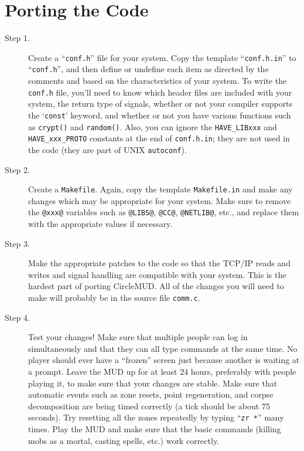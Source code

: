 \documentclass[11pt]{article}
\begin{document}
\section{Porting the Code}
\begin{description}
\item[Step 1.] Create a ``\texttt{conf.h}'' file for your system.\newline
Copy the template ``\texttt{conf.h.in}'' to ``\texttt{conf.h}'', and then define or undefine each item as directed by the comments and based on the characteristics of your system.  To write the \texttt{conf.h} file, you'll need to know which header files are included with your system, the return type of signals, whether or not your compiler supports the `\texttt{const}' keyword, and whether or not you have various functions such as \texttt{crypt()} and \texttt{random()}.\newline
Also, you can ignore the \texttt{HAVE\_LIBxxx} and \texttt{HAVE\_xxx\_PROTO} constants at the end of \texttt{conf.h.in}; they are not used in the code (they are part of UNIX \texttt{autoconf}).

\item[Step 2.] Create a \texttt{Makefile}.\newline
Again, copy the template \texttt{Makefile.in} and make any changes which may be appropriate for your system.  Make sure to remove the \texttt{@xxx@} variables such as \texttt{@LIBS@}, \texttt{@CC@}, \texttt{@NETLIB@}, etc., and replace them with the appropriate values if necessary.

\item[Step 3.] Make the appropriate patches to the code so that the TCP/IP reads and writes and signal handling are compatible with your system. This is the hardest part of porting CircleMUD.  All of the changes you will need to make will probably be in the source file \texttt{comm.c}.

\item[Step 4.] Test your changes!  Make sure that multiple people can log in simultaneously and that they can all type commands at the same time.  No player should ever have a ``frozen'' screen just because another is waiting at a prompt.  Leave the MUD up for at least 24 hours, preferably with people playing it, to make sure that your changes are stable.  Make sure that automatic events such as zone resets, point regeneration, and corpse decomposition are being timed correctly (a tick should be about 75 seconds).  Try resetting all the zones repeatedly by typing ``\texttt{zr *}'' many times.  Play the MUD and make sure that the basic commands (killing mobs as a mortal, casting spells, etc.) work correctly.


\end{description}
\end{document}
